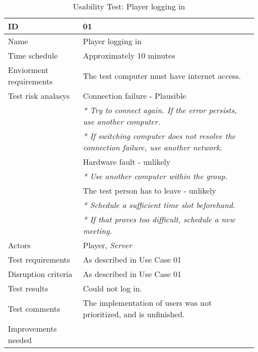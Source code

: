
{\footnotesize
\begin{table}[H]
\begin{tabular}{| p{5cm} | p{10cm} |}\hline
	\textbf{ID}	& \textbf{01} \\ \hline
	Name		& Player logging in\\ \hline
	Time schedule	& Approximately 10 minutes\\ \hline
	Enviorment requirements 
		& The test computer must have internet access. \\ \hline
	Test risk analasys 
		& Connection failure - Plausible \\
		& \emph{* Try to connect again. If the error persists, use another computer.} \\
		& \emph{* If switching computer does not resolve the connection failure, use another network.}\\
		& Hardware fault - unlikely \\
		& \emph{* Use another computer within the group.} \\
		& The test person has to leave - unlikely \\
		& \emph{* Schedule a sufficient time slot beforehand.} \\
		& \emph{* If that proves too difficult, schedule a new meeting.}\\ \hline
	Actors	& Player, \emph{Server}\\ \hline
	Test requirements & As described in Use Case 01 \\ \hline
	Disruption criteria & As described in Use Case 01  \\ \hline
	Test results & Could not log in.\\ \hline
	Test comments & The implementation of users was not prioritized, and is unfinished. \\ \hline
	Improvements needed & \\ \hline
\end{tabular}


\caption{Usability Test: Player logging in}
\label{fig:usability_test_1}
\end{table}}


